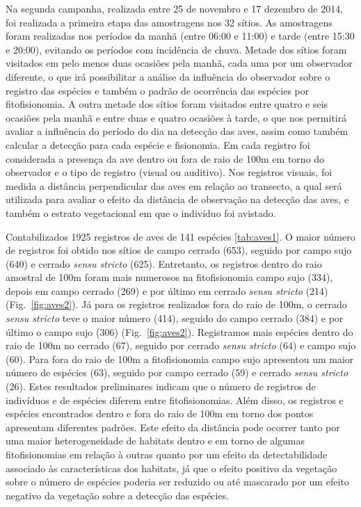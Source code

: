 Na segunda campanha, realizada entre 25 de novembro e 17 dezembro de
2014, foi realizada a primeira etapa das amostragens nos 32 sítios. 
As amostragens foram realizadas nos períodos da manhã (entre 06:00 e
11:00) e tarde (entre 15:30 e 20:00), evitando os períodos com
incidência de chuva. Metade dos sítios foram visitados em
pelo menos duas ocasiões pela manhã, cada uma por um observador
diferente, o que irá possibilitar a análise da influência do
observador sobre o registro das espécies e também o
padrão de ocorrência das espécies por fitofisionomia. A outra metade
dos sítios foram visitados entre quatro e seis ocasiões pela manhã e
entre duas e quatro ocasiões à tarde, o que nos permitirá avaliar a
influência do período do dia na detecção das aves, assim como também
calcular a detecção para cada espécie e fisionomia. Em cada registro
foi considerada a presença da ave dentro ou fora de raio de 100m em torno do observador
e o tipo de registro (visual ou auditivo). Nos registros visuais, foi
medida a distância perpendicular das aves em relação ao
transecto, a qual será utilizada para avaliar o efeito da distância de
observação na detecção das aves, e também o estrato vegetacional em que o
indivíduo foi avistado. 

Contabilizados 1925 registros de aves de 141 espécies \ref{tab:aves1}.
O maior número de
registros foi obtido nos sítios de campo cerrado (653), seguido
por campo sujo (640) e cerrado \textit{sensu stricto}
(625). Entretanto, os
registros dentro do raio amostral de 100m foram mais numerosos na
fitofisionomia campo sujo (334), depois em campo cerrado (269) e por
último em cerrado \textit{sensu stricto} (214) (Fig.~\ref{fig:aves2}). 
Já para os
registros realizados fora do raio de 100m,
o cerrado \textit{sensu stricto} teve o maior número (414), 
seguido do campo cerrado (384) e
por último o campo sujo (306) (Fig.~\ref{fig:aves2}). 
Registramos mais espécies dentro do raio de 100m no
cerrado (67), seguido por cerrado \textit{sensu stricto} (64) e campo
sujo (60). Para fora do raio de 100m 
a fitofisionomia campo sujo apresentou um maior número de espécies (63), seguido por campo
cerrado (59) e cerrado \textit{sensu stricto} (26).
Estes resultados preliminares indicam que o número de registros de indivíduos e de espécies
diferem entre fitofisionomias. Além disso, 
os registros e espécies encontrados dentro e fora do raio de 100m
em torno dos pontos apresentam diferentes padrões. Este efeito da
distância pode ocorrer tanto por uma maior heterogeneidade de habitats
dentro e em torno de algumas fitofisionomias em relação à outras quanto por um
efeito da detectabilidade associado às características dos habitats,
já que o efeito positivo da vegetação sobre o número de espécies
poderia ser reduzido ou até mascarado por um efeito negativo da
vegetação sobre a detecção das espécies.

